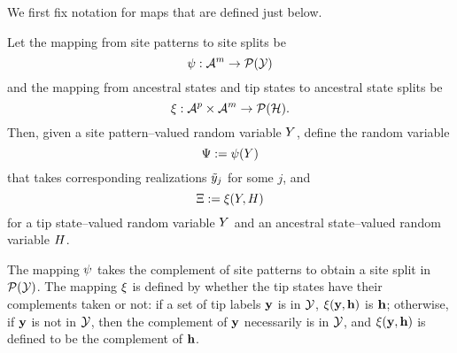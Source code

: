 We first fix notation for maps that are defined just below.
\begin{definition}
Let the mapping from site patterns to site splits be
$$
\psi:\mathcal{A}^m\rightarrow\mathcal{P}(\mathcal{Y})
$$
and the mapping from ancestral states and tip states to ancestral state splits be
$$
\xi:\mathcal{A}^p\times\mathcal{A}^m\rightarrow\mathcal{P}(\mathcal{H}).
$$
Then, given a site pattern--valued random variable $Y$, define the random variable
$$
\Psi := \psi(Y)
$$
that takes corresponding realizations $\tilde{y}_j$ for some $j$, and
$$
\Xi := \xi(Y, H)
$$
for a tip state--valued random variable $Y$ and an ancestral state--valued random variable $H$.
\end{definition}
The mapping $\psi$ takes the complement of site patterns to obtain a site split in $\mathcal{P}(\mathcal{Y})$.
The mapping $\xi$ is defined by whether the tip states have their complements taken or not: if a set of tip labels $\mathbf{y}$ is in $\mathcal{Y}$, $\xi(\mathbf{y}, \mathbf{h})$ is $\mathbf{h}$; otherwise, if $\mathbf{y}$ is not in $\mathcal{Y}$, then the complement of $\mathbf{y}$ necessarily is in $\mathcal{Y}$, and $\xi(\mathbf{y}, \mathbf{h})$ is defined to be the complement of $\mathbf{h}$.

